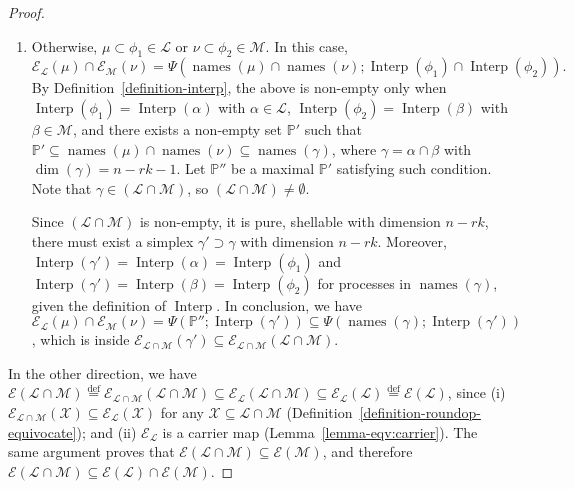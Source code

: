 \documentclass[11pt]{article}
\newcommand{\cE}{\ensuremath{\mathcal{E}}}
\newcommand{\cL}{\ensuremath{\mathcal{L}}}
\newcommand{\cM}{\ensuremath{\mathcal{M}}}
\newcommand{\cX}{\ensuremath{\mathcal{X}}}
\newcommand{\bbP}{\ensuremath{\mathbb{P}}}
\DeclareMathOperator{\names}{names}\DeclareMathOperator{\name}{name}\DeclareMathOperator{\sgn}{sgn}
\DeclareMathOperator{\interp}{Interp}
\begin{document}
\begin{proof}
\begin{enumerate}
\item
Otherwise, $\mu \subset \phi_1 \in \cL$ or $\nu \subset \phi_2 \in \cM$.
In this case,
$$ \cE_{\cL}(\mu) \cap \cE_{\cM}(\nu) = \Psi(\names(\mu) \cap \names(\nu); {\interp(\phi_1) \cap \interp(\phi_2)}) \mathrm{.} $$
By Definition~\ref{definition-interp},
the above is non-empty only when
$\interp(\phi_1) = \interp(\alpha)$ with $\alpha \in \cL$,
$\interp(\phi_2) = \interp(\beta)$ with $\beta \in \cM$,
and there exists a non-empty set $\bbP'$
such that $\bbP' \subseteq \names(\mu) \cap \names(\nu) \subseteq \names(\gamma)$,
where $\gamma = \alpha \cap \beta$ with $\dim(\gamma) = n -rk -1$.
Let $\bbP''$ be a maximal $\bbP'$ satisfying such condition.
Note that $\gamma \in (\cL \cap \cM)$, so $(\cL \cap \cM) \ne \emptyset$.

Since $(\cL \cap \cM)$ is non-empty,
it is pure, shellable with dimension $n -rk$,
there must exist a simplex $\gamma' \supset \gamma$ with dimension $n -rk$.
Moreover,
$\interp(\gamma') = \interp(\alpha) = \interp(\phi_1)$
and
$\interp(\gamma') = \interp(\beta) = \interp(\phi_2)$
for processes in $\names(\gamma)$,
given the definition of $\interp$.
In conclusion, we have
$\cE_{\cL}(\mu) \cap \cE_{\cM}(\nu) = \Psi(\bbP''; \interp(\gamma')) \subseteq \Psi(\names(\gamma); \interp(\gamma'))$,
which is inside $\cE_{\cL \cap \cM}(\gamma') \subseteq \cE_{\cL \cap \cM}(\cL \cap \cM)$.
\end{enumerate}

In the other direction,
we have
$\cE(\cL \cap \cM) \stackrel{\textrm{def}}{=} \cE_{\cL \cap \cM}(\cL \cap \cM) \subseteq \cE_{\cL}(\cL \cap \cM)
\subseteq \cE_{\cL}(\cL) \stackrel{\textrm{def}}{=} \cE(\cL)$,
since
(i) $\cE_{\cL \cap \cM}(\cX) \subseteq \cE_{\cL}(\cX)$ for any $\cX \subseteq \cL \cap \cM$
(Definition~\ref{definition-roundop-equivocate});
and (ii)
$\cE_{\cL}$ is a carrier map (Lemma~\ref{lemma-eqv:carrier}).
The same argument proves that $\cE(\cL \cap \cM) \subseteq \cE(\cM)$,
and therefore $\cE(\cL \cap \cM) \subseteq \cE(\cL) \cap \cE(\cM)$.
\end{proof}
\end{document}
